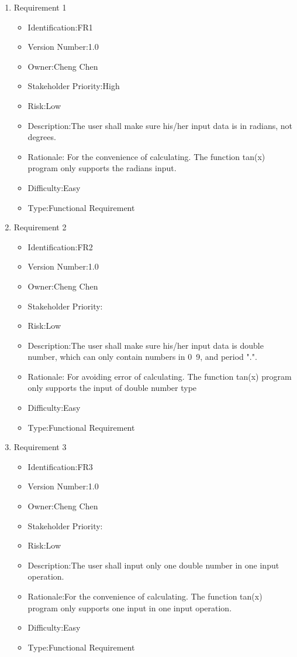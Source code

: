 \documentclass[10pt,a4paper,twoside]{article}
\begin{document}
\begin{enumerate}
\item 
Requirement 1
\begin{itemize}
\item Identification:FR1
\item Version Number:1.0
\item Owner:Cheng Chen
\item Stakeholder Priority:High
\item Risk:Low
\item Description:The user shall make sure his/her input data is in radians, not degrees.
\item Rationale: For the convenience of calculating. The function tan(x) program only supports the radians input.
\item Difficulty:Easy
\item Type:Functional Requirement
\end{itemize} 

\item 
Requirement 2
\begin{itemize}
\item Identification:FR2
\item Version Number:1.0
\item Owner:Cheng Chen
\item Stakeholder Priority:
\item Risk:Low
\item Description:The user shall make sure his/her input data is double number, which can only contain numbers in 0~9, and period ".".
\item Rationale: For avoiding error of calculating. The function tan(x) program only supports the input of double number type
\item Difficulty:Easy
\item Type:Functional Requirement
\end{itemize} 

\item 
Requirement 3
\begin{itemize}
\item Identification:FR3
\item Version Number:1.0
\item Owner:Cheng Chen
\item Stakeholder Priority:
\item Risk:Low
\item Description:The user shall input only one double number in one input operation.
\item Rationale:For the convenience of calculating. The function tan(x) program only supports one input in one input operation.
\item Difficulty:Easy
\item Type:Functional Requirement
\end{itemize} 


\end{enumerate}
\end{document}

